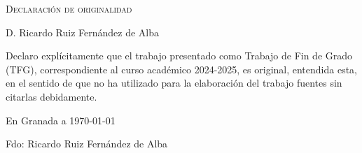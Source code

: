 \thispagestyle{empty}

\hfill\vfill

\textsc{Declaración de originalidad}\\\bigskip

D. Ricardo Ruiz Fernández de Alba \\\medskip

Declaro explícitamente que el trabajo presentado como Trabajo de Fin de Grado (TFG), correspondiente al curso académico 2024-2025, es original, entendida esta, en el sentido de que no ha utilizado para la elaboración del trabajo fuentes sin citarlas debidamente.
\medskip

En Granada a \today 
\begin{flushleft} 
Fdo: Ricardo Ruiz Fernández de Alba

\end{flushleft}

\vfill

\cleardoublepage
\endinput